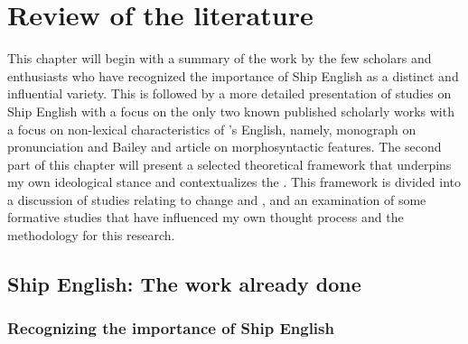 \chapter{{Review} {of} {the} {literature}}

  This chapter will begin with a summary of the work by the few scholars and enthusiasts who have recognized the importance of Ship English as a distinct and influential variety. This is followed by a more detailed presentation of studies on Ship English with a focus on the only two known published scholarly works with a focus on non-lexical characteristics of  ’s English, namely,  monograph on pronunciation and Bailey and  article on morphosyntactic features. The second part of this chapter will present a selected theoretical framework that underpins my own ideological stance and contextualizes the . This framework is divided into a discussion of studies relating to  change and , and an examination of some formative studies that have influenced my own thought process and the methodology for this research. 

\section{{Ship} {English:} {The} {work} {already} {done}}%

\subsection{{Recognizing} {the} {importance} {of} {Ship} {English}}%

